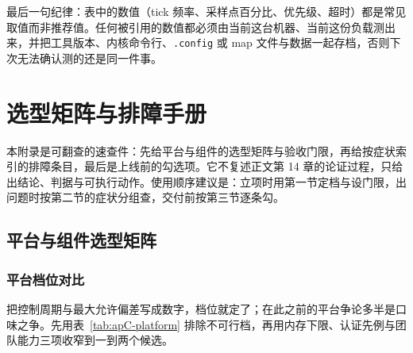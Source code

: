 \documentclass[12pt,a4paper,fontset=fandol]{ctexbook}
\newcommand{\Tp}[1]{\texttt{#1}}
\begin{document}
最后一句纪律：表中的数值（tick 频率、采样点百分比、优先级、超时）都是常见取值而非推荐值。任何被引用的数值都必须由当前这台机器、当前这份负载测出来，并把工具版本、内核命令行、\Tp{.config} 或 map 文件与数据一起存档，否则下次无法确认测的还是同一件事。


\chapter{选型矩阵与排障手册}

\label{ap:apC-selection}

本附录是可翻查的速查件：先给平台与组件的选型矩阵与验收门限，再给按症状索引的排障条目，最后是上线前的勾选项。它不复述正文第 14 章的论证过程，只给出结论、判据与可执行动作。使用顺序建议是：立项时用第一节定档与设门限，出问题时按第二节的症状分组查，交付前按第三节逐条勾。

\section{平台与组件选型矩阵}

\subsection{平台档位对比}

\begin{guideline}[title={先定延迟档位，再谈平台偏好}]
把控制周期与最大允许偏差写成数字，档位就定了；在此之前的平台争论多半是口味之争。先用表~\ref{tab:apC-platform} 排除不可行档，再用内存下限、认证先例与团队能力三项收窄到一到两个候选。
\end{guideline}
\end{document}
